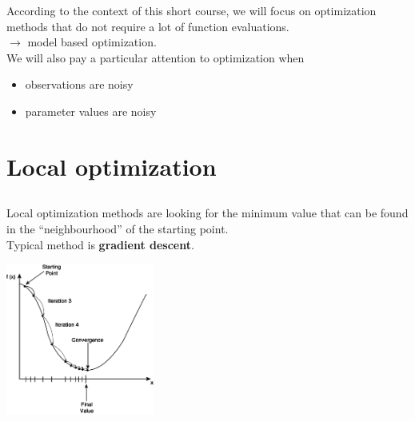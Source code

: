 \documentclass{beamer}
\begin{document}
\begin{frame}{}
According to the context of this short course, we will focus on optimization methods that do not require a lot of function evaluations.\\
$\rightarrow$ model based optimization.\\
\vspace{5mm}
We will also pay a particular attention to optimization when
	\begin{itemize}
	 	\item observations are noisy
	 	\item parameter values are noisy
	 \end{itemize} 
\end{frame}

\section{Local optimization}
\subsection{}

\begin{frame}{}
Local optimization methods are looking for the minimum value that can be found in the ``neighbourhood'' of the starting point.\\
\vspace{5mm}
Typical method is \textbf{gradient descent}.\\
\vspace{5mm}
\begin{center}
\includegraphics[height=5cm]{figures/grad_desc1}
\end{center}
\end{frame}
\end{document}
